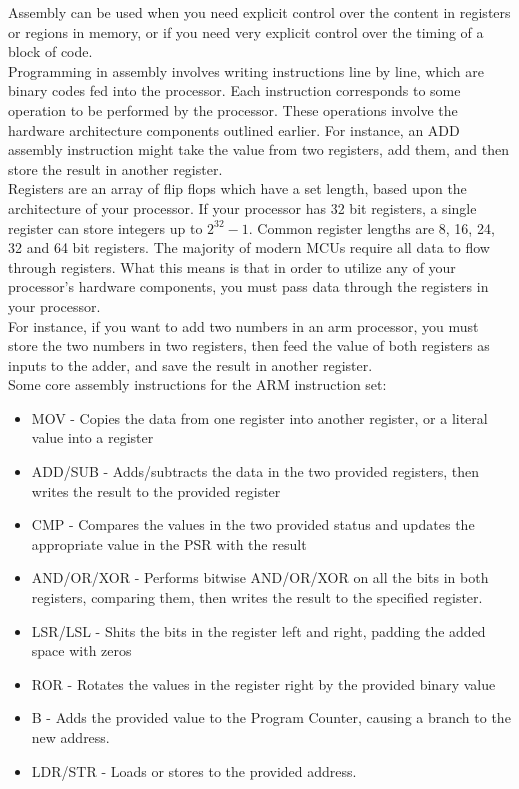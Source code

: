 \documentclass[10pt]{article}
\begin{document}
Assembly can be used when you need explicit control over the content in registers or regions in memory, or if you need very explicit control over the timing of a block of code.\\

Programming in assembly involves writing instructions line by line, which are binary codes fed into the processor. Each instruction corresponds to some operation to be performed by the processor. These operations involve the hardware architecture components outlined earlier. For instance, an ADD assembly instruction might take the value from two registers, add them, and then store the result in another register. \\

Registers are an array of flip flops which have a set length, based upon the architecture of your processor. If your processor has 32 bit registers, a single register can store integers up to $2^{32}-1$. Common register lengths are 8, 16, 24, 32 and 64 bit registers. The majority of modern MCUs require all data to flow through registers. What this means is that in order to utilize any of your processor's hardware components, you must pass data through the registers in your processor. \\

For instance, if you want to add two numbers in an arm processor, you must store the two numbers in two registers, then feed the value of both registers as inputs to the adder, and save the result in another register. \\


Some core assembly instructions for the ARM instruction set:
\begin{itemize}
\item MOV - Copies the data from one register into another register, or a literal value into a register
\item ADD/SUB - Adds/subtracts the data in the two provided registers, then writes the result to the provided register
\item CMP - Compares the values in the two provided status and updates the appropriate value in the PSR with the result
\item AND/OR/XOR - Performs bitwise AND/OR/XOR on all the bits in both registers, comparing them, then writes the result to the specified register.
\item LSR/LSL - Shits the bits in the register left and right, padding the added space with zeros
\item ROR - Rotates the values in the register right by the provided binary value
\item B - Adds the provided value to the Program Counter, causing a branch to the new address.
\item LDR/STR - Loads or stores to the provided address. 
\end{itemize}  
\end{document}
